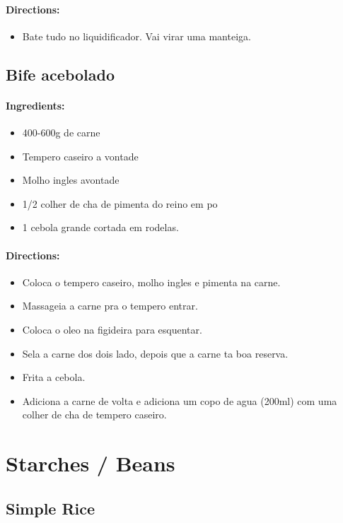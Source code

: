 \documentclass{article}
\begin{document}
\paragraph{Directions:}
\begin{itemize}
	\item Bate tudo no liquidificador. Vai virar uma manteiga.
\end{itemize}

\subsection{Bife acebolado}

\paragraph{Ingredients:}
\begin{itemize}
	\item 400-600g de carne
	\item Tempero caseiro a vontade
	\item Molho ingles  avontade
	\item 1/2 colher de cha de pimenta do reino em po
	\item 1 cebola grande cortada em rodelas.
\end{itemize}

\paragraph{Directions:}
\begin{itemize}
	\item Coloca o tempero caseiro, molho ingles e pimenta na carne. 
	\item Massageia a carne pra o tempero entrar.
	\item Coloca o oleo na figideira para esquentar.
	\item Sela a carne dos dois lado, depois que a carne ta boa reserva.
	\item Frita a cebola.
	\item Adiciona a carne de volta e adiciona um copo de agua (200ml) com uma colher de cha de tempero caseiro.
\end{itemize}

\section{Starches / Beans}

\subsection{Simple Rice}
\end{document}
